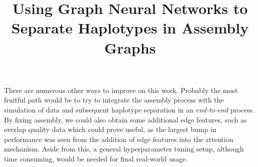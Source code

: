 \documentclass[times, utf8, diplomski, english]{fer_eng}
\begin{document}
There are numerous other ways to improve on this work. Probably the most fruitful path would be to try to integrate the assembly process with the simulation of data and subsequent haplotype separation in an \textit{end-to-end} process. By fixing assembly, we could also obtain some additional edge features, such as overlap quality data which could prove useful, as the largest bump in performance was seen from the addition of edge features into the attention mechanism. Aside from this, a general hyperparameter tuning setup, although time consuming, would be needed for final real-world usage.





\clearpage

\title{Using Graph Neural Networks to Separate Haplotypes in Assembly Graphs}
\begin{abstract}

\end{abstract}

\begin{sazetak}

\end{sazetak}
\end{document}
